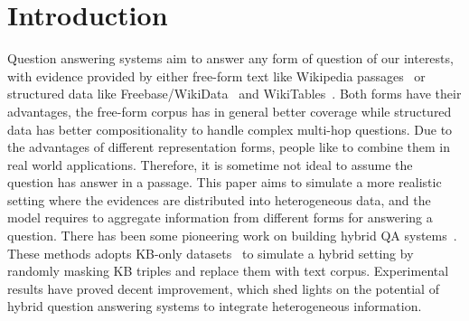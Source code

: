 \documentclass[11pt,a4paper]{article}
\begin{document}
\section{Introduction}
Question answering systems aim to answer any form of question of our interests, with evidence provided by either free-form text like Wikipedia passages~\cite{rajpurkar2016squad,chen2017reading,yang2018hotpotqa} or structured data like Freebase/WikiData~\cite{berant2013semantic,kwiatkowski2013scaling,yih2015semantic,weston2015towards} and WikiTables~\cite{pasupat2015compositional}. Both forms have their advantages, the free-form corpus has in general better coverage while structured data has better compositionality to handle complex multi-hop questions. Due to the advantages of different representation forms, people like to combine them in real world applications. Therefore, it is sometime not ideal to assume the question has answer in a passage. This paper aims to simulate a more realistic setting where the evidences are distributed into heterogeneous data, and the model requires to aggregate  information from different forms for answering a question. There has been some pioneering work on building hybrid QA systems~\cite{sun2019pullnet,sun2018open,xiong2019improving}. These methods adopts KB-only datasets~\cite{berant2013semantic,yih2015semantic,talmor2018web} to simulate a hybrid setting by randomly masking KB triples and replace them with text corpus. Experimental results have proved decent improvement, which shed lights on the potential of hybrid question answering systems to integrate heterogeneous information.
\end{document}
